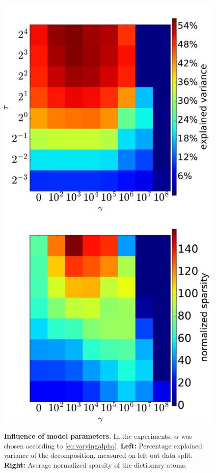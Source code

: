 \begin{figure}[!htbp]
  \includegraphics[width=.45\linewidth]{figures/heat_LANGUAGE_1.pdf}
  \includegraphics[width=.45\linewidth]{figures/sparsity.pdf}
  \caption{\textbf{Influence of model parameters.} %
In the experiments, $\alpha$ was chosen according to \eqref{eq:varyingalpha}. \textbf{Left:} Percentage explained variance of the decomposition, measured on left-out data split.
    \textbf{Right: }%
    Average normalized sparsity of the dictionary atoms. %
  }
  \label{fig:param}
\end{figure}

